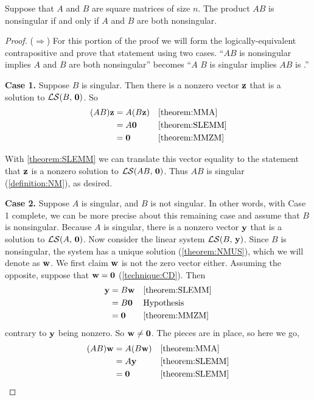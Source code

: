 \documentclass{ximera}
\begin{document}
\begin{theorem}
  \label{theorem:NPNT}
  
  Suppose that $A$ and $B$ are square matrices of size $n$.  The
  product $AB$ is nonsingular if and only if $A$ and $B$ are both
  nonsingular.

  \begin{proof}
    ($\Rightarrow$) For this portion of the proof we will form the
    logically-equivalent contrapositive and prove that statement using
    two cases.  ``$AB$ is nonsingular implies $A$ and $B$ are both
    nonsingular'' becomes ``$A$  $B$ is singular implies $AB$ is
    .''

    \textbf{Case 1.}  Suppose $B$ is singular.  Then there is a
    nonzero vector $\mathbf{z}$ that is a solution to $\mathcal{LS}\!\left(B,\,\mathbf{0}\right)$.
    So
    \begin{align*}
      (AB)\mathbf{z}
      &=A(B\mathbf{z})&&\ref{theorem:MMA}\\
      &=A\mathbf{0}&&\ref{theorem:SLEMM}\\
      &=\mathbf{0}&&\ref{theorem:MMZM}\\
    \end{align*}

    With \ref{theorem:SLEMM} we can translate this vector equality to
    the statement that $\mathbf{z}$ is a nonzero solution to
    $\mathcal{LS}\!\left(AB,\,\mathbf{0}\right)$.  Thus $AB$ is singular (\ref{definition:NM}),
    as desired.

    \textbf{Case 2.}  Suppose $A$ is singular, and $B$ is not
    singular.  In other words, with Case 1 complete, we can be more
    precise about this remaining case and assume that $B$ is
    nonsingular.  Because $A$ is singular, there is a nonzero vector
    $\mathbf{y}$ that is a solution to $\mathcal{LS}\!\left(A,\,\mathbf{0}\right)$.  Now consider
    the linear system $\mathcal{LS}\!\left(B,\,\mathbf{y}\right)$.  Since $B$ is
    nonsingular, the system has a unique solution
    (\ref{theorem:NMUS}), which we will denote as $\mathbf{w}$.  We
    first claim $\mathbf{w}$ is not the zero vector either.  Assuming
    the opposite, suppose that $\mathbf{w}=\mathbf{0}$
    (\ref{technique:CD}).  Then
    \begin{align*}
      \mathbf{y}
      &=B\mathbf{w}&&\ref{theorem:SLEMM}\\
      &=B\mathbf{0}&&\text{Hypothesis}\\
      &=\mathbf{0}&&\ref{theorem:MMZM}
    \end{align*}
    contrary to $\mathbf{y}$ being nonzero.  So $\mathbf{w}\neq\mathbf{0}$.  The pieces are in place, so here we go,
    \begin{align*}
      (AB)\mathbf{w}
      &=A(B\mathbf{w})&&\ref{theorem:MMA}\\
      &=A\mathbf{y}&&\ref{theorem:SLEMM}\\
      &=\mathbf{0}&&\ref{theorem:SLEMM}\\
    \end{align*}


\end{proof}
\end{theorem}
\end{document}
